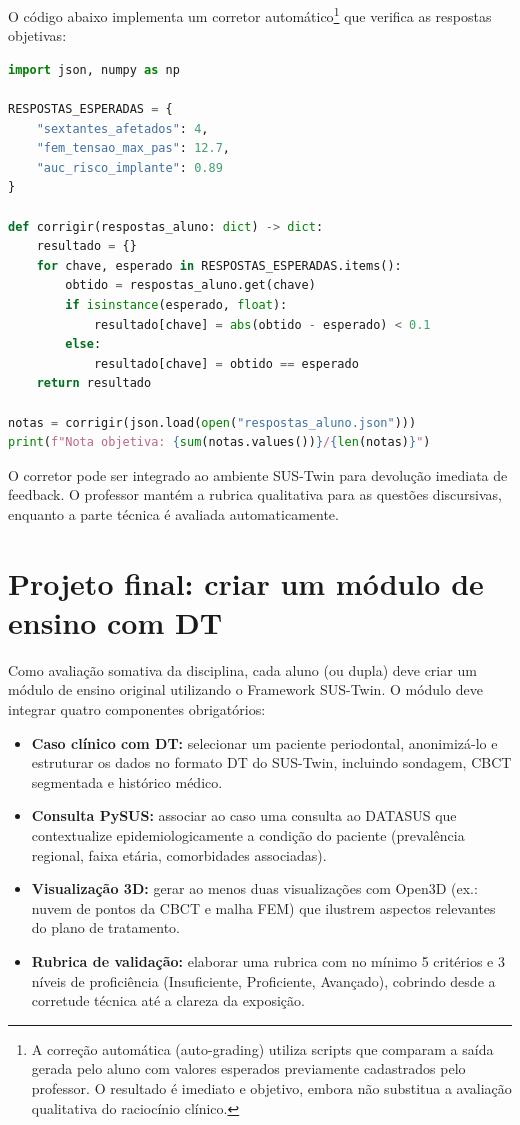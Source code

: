 O código abaixo implementa um corretor automático\footnote{A correção
automática (auto-grading) utiliza scripts que comparam a saída gerada pelo
aluno com valores esperados previamente cadastrados pelo professor. O
resultado é imediato e objetivo, embora não substitua a avaliação
qualitativa do raciocínio clínico.} que verifica as respostas objetivas:

\begin{lstlisting}[language=Python,
caption={auto\_grader\_osce.py -- corretor automático do OSCE digital}]
import json, numpy as np

RESPOSTAS_ESPERADAS = {
    "sextantes_afetados": 4,
    "fem_tensao_max_pas": 12.7,
    "auc_risco_implante": 0.89
}

def corrigir(respostas_aluno: dict) -> dict:
    resultado = {}
    for chave, esperado in RESPOSTAS_ESPERADAS.items():
        obtido = respostas_aluno.get(chave)
        if isinstance(esperado, float):
            resultado[chave] = abs(obtido - esperado) < 0.1
        else:
            resultado[chave] = obtido == esperado
    return resultado

notas = corrigir(json.load(open("respostas_aluno.json")))
print(f"Nota objetiva: {sum(notas.values())}/{len(notas)}")

\end{lstlisting}

O corretor pode ser integrado ao ambiente SUS-Twin para devolução imediata
de feedback. O professor mantém a rubrica qualitativa para as questões
discursivas, enquanto a parte técnica é avaliada automaticamente.

\section{Projeto final: criar um módulo de ensino com DT}
\label{sec:projeto-final}

Como avaliação somativa da disciplina, cada aluno (ou dupla) deve criar um
módulo de ensino original utilizando o Framework SUS-Twin. O módulo deve
integrar quatro componentes obrigatórios:

\begin{itemize}
\item \textbf{Caso clínico com DT:} selecionar um paciente periodontal,
anonimizá-lo e estruturar os dados no formato DT do SUS-Twin, incluindo
sondagem, CBCT segmentada e histórico médico.
\item \textbf{Consulta PySUS:} associar ao caso uma consulta ao DATASUS que
contextualize epidemiologicamente a condição do paciente (prevalência
regional, faixa etária, comorbidades associadas).
\item \textbf{Visualização 3D:} gerar ao menos duas visualizações com Open3D
(ex.: nuvem de pontos da CBCT e malha FEM) que ilustrem aspectos relevantes
do plano de tratamento.
\item \textbf{Rubrica de validação:} elaborar uma rubrica com no mínimo 5
critérios e 3 níveis de proficiência (Insuficiente, Proficiente, Avançado),
cobrindo desde a corretude técnica até a clareza da exposição.
\end{itemize}

